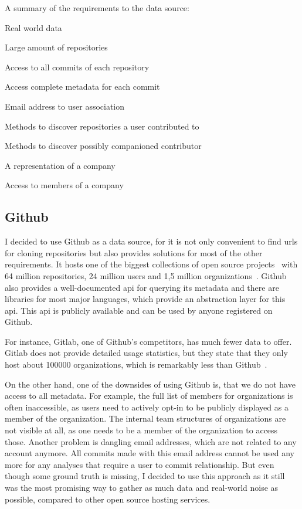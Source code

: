 \begin{itemlist}{A summary of the requirements to the data source:}
    \item Real world data
    \item Large amount of repositories
    \item Access to all commits of each repository
    \item Access complete metadata for each commit
    \item Email address to user association
    \item Methods to discover repositories a user contributed to
    \item Methods to discover possibly companioned contributor
    \item A representation of a company
    \item Access to members of a company
\end{itemlist}


\subsection{Github}\label{github}
I decided to use Github as a data source, for it is not only convenient to find \acp{url} for cloning repositories but also provides solutions for most of the other requirements.
It hosts one of the biggest collections of open source projects~\cite{techreport:how-github-conquered} with 64 million repositories, 24 million users and 1,5 million organizations~\cite{article:github-statistics}.
Github also provides a well-documented \ac{api} for querying its metadata and there are libraries for most major languages, which provide an abstraction layer for this \ac{api}.
This \ac{api} is publicly available and can be used by anyone registered on Github.

For instance, Gitlab, one of Github's competitors, has much fewer data to offer.
Gitlab does not provide detailed usage statistics, but they state that they only host about 100000 organizations, which is remarkably less than Github~\cite{article:gitlab-help}.

On the other hand, one of the downsides of using Github is, that we do not have access to all metadata.
For example, the full list of members for organizations is often inaccessible, as users need to actively opt-in to be publicly displayed as a member of the organization.
The internal team structures of organizations are not visible at all, as one needs to be a member of the organization to access those.
Another problem is dangling email addresses, which are not related to any account anymore.
All commits made with this email address cannot be used any more for any analyses that require a user to commit relationship.
But even though some ground truth is missing, I decided to use this approach as it still was the most promising way to gather as much data and real-world noise as possible, compared to other open source hosting services.

